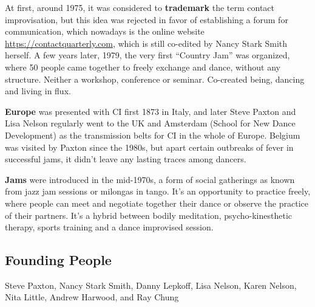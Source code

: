 At first, around 1975, it was considered to \textbf{trademark} the term contact improvisation, but this idea was rejected in favor of establishing a forum for communication, which nowadays is the online website \url{https://contactquarterly.com}, which is still co-edited by Nancy Stark Smith herself.
A few years later, 1979, the very first ``Country Jam'' was organized, where 50 people came together to freely exchange and dance, without any structure.
Neither a workshop, conference or seminar.
Co-created being, dancing and living in flux.

\textbf{Europe} was presented with CI first 1873 in Italy, and later Steve Paxton and Lisa Nelson regularly went to the UK and Amsterdam (School for New Dance Development) as the transmission belts for CI in the whole of Europe.
Belgium was visited by Paxton since the 1980s, but apart certain outbreaks of fever in successful jams, it didn't leave any lasting traces among dancers.

\textbf{Jams} were introduced in the mid-1970s, a form of social gatherings as known from jazz jam sessions or milongas in tango.
It's an opportunity to practice freely, where people can meet and negotiate together their dance or observe the practice of their partners.
It's a hybrid between bodily meditation, psycho-kinesthetic therapy, sports training and a dance improvised session.

\subsection{Founding People}\label{subsec:founding-people}


Steve Paxton, Nancy Stark Smith, Danny Lepkoff, Lisa Nelson, Karen Nelson, Nita Little, Andrew Harwood, and Ray Chung